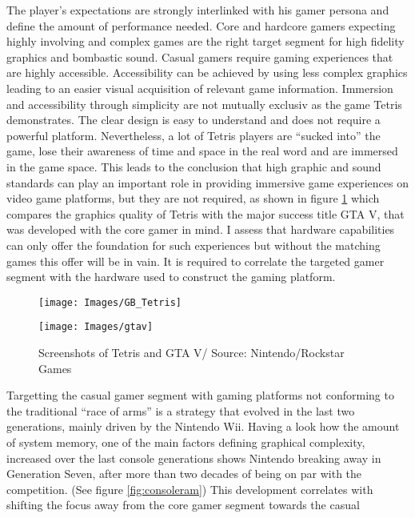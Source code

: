 \documentclass
[
    a4paper,
    11pt
]
{article}
\begin{document}
The player's expectations are strongly interlinked with his gamer
persona and define the amount of performance needed. Core and
hardcore gamers expecting highly involving and complex games
are the right target segment for high fidelity graphics and
bombastic sound. Casual gamers require gaming experiences that are
highly accessible. Accessibility can be achieved by using less complex
graphics leading to an easier visual acquisition of relevant game
information. Immersion and accessibility through simplicity are not
mutually exclusiv as the game Tetris demonstrates. The clear design is
easy to understand and does not require a powerful platform.
Nevertheless, a lot of Tetris players are ``sucked into'' the game, lose
their awareness of time and space in the real word and are immersed in
the game space. \cite{Jennett2008} This leads to the conclusion that
high graphic and sound standards can play an important role in providing
immersive game experiences on video game platforms, but they are not
required, as shown in figure \ref{fig:screenshots} which compares the
graphics quality of Tetris with the major success title GTA V, that was
developed with the core gamer in mind. I assess that hardware
capabilities can only offer the foundation for such experiences but
without the matching games this offer will be in vain. It is required to
correlate the targeted gamer segment with the hardware used to construct
the gaming platform.
%
\begin{figure}[ht!]
 \centering
    \begin{subfloat}
        \texttt{[image: Images/GB\_Tetris]}
    \end{subfloat}
    \begin{subfloat}
        \texttt{[image: Images/gtav]}
    \end{subfloat}
    \caption{Screenshots of Tetris and GTA V/ Source: Nintendo/Rockstar Games}
    \label{fig:screenshots}
 \end{figure}
%
Targetting the casual gamer segment with gaming platforms not conforming
to the traditional ``race of arms'' is a strategy that evolved in the
last two generations, mainly driven by the Nintendo Wii. \cite{Juul2009}
Having a look how the amount of system memory, one of the main factors
defining graphical complexity, increased over the last console
generations shows Nintendo breaking away in Generation
Seven, after more than two decades of being on par with the competition.
(See figure \ref{fig:consoleram}) This development correlates with
shifting the focus away from the core gamer segment towards the casual
\end{document}
